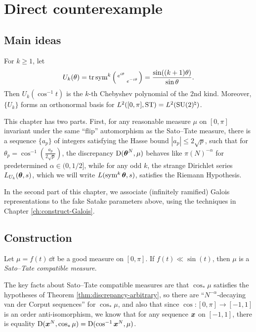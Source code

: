 
\chapter{Direct counterexample}





\section{Main ideas}

For $k\geqslant 1$, let 
\[
	U_k(\theta) = \operatorname{tr}\operatorname{sym}^k\left(\begin{smallmatrix} e^{i\theta} &  \\  & e^{- i \theta} \end{smallmatrix}\right) = \frac{\sin((k+1)\theta)}{\sin\theta} .
\]
Then $U_k(\cos^{-1} t)$ is the $k$-th Chebyshev polynomial of the 2nd kind. 
Moreover, $\{U_k\}$ forms an orthonormal basis for 
$L^2([0,\pi],\mathrm{ST}) = L^2(\operatorname{SU}(2)^\natural)$. 

This chapter has two parts. First, for any reasonable measure $\mu$ on 
$[0,\pi]$ invariant under the same ``flip'' automorphism as the Sato--Tate 
measure, there is a sequence $\{a_p\}$ of integers satisfying the Hasse 
bound $|a_p|\leqslant 2\sqrt p$, such that for 
$\theta_p = \cos^{-1}\left(\frac{a_p}{2\sqrt p}\right)$, the discrepancy 
$\operatorname{D}({\boldsymbol\theta}^N,\mu)$ behaves like $\pi(N)^{-\alpha}$ for 
predetermined $\alpha\in (0,1/2]$, while for any odd $k$, the strange 
Dirichlet series $L_{U_k}({\boldsymbol\theta},s)$, which we will write 
$L(\operatorname{sym}^k {\boldsymbol\theta},s)$, satisfies the Riemann Hypothesis. 

In the second part of this chapter, we associate (infinitely ramified) Galois 
representations to the fake Satake parameters above, using the techniques 
in Chapter \ref{ch:construct-Galois}. 





\section{Construction}


\begin{definition}
Let $\mu = f(t)\, \dd t$ be a good measure on $[0,\pi]$. If 
$f(t) \ll \sin(t)$, then $\mu$ is a \emph{Sato--Tate compatible measure}. 
\end{definition}

The key facts about Sato--Tate compatible measures are that $\cos_\ast\mu$ 
satisfies the hypotheses of Theorem \ref{thm:discrepancy-arbitrary}, so 
there are ``$N^{-\alpha}$-decaying van der Corput sequences'' for 
$\cos_\ast\mu$, and also that since $\cos\colon [0,\pi] \to [-1,1]$ is an 
order anti-isomorphism, we know that for any sequence ${\boldsymbol x}$ on $[-1,1]$, there 
is equality $\operatorname{D}({\boldsymbol x}^N,\cos_\ast\mu) = \operatorname{D}(\cos^{-1}{\boldsymbol x}^N,\mu)$. 


